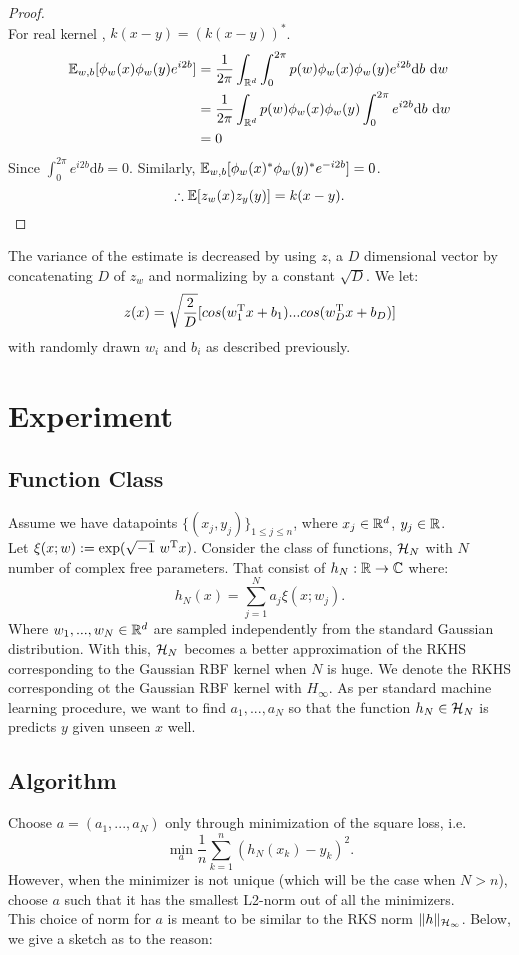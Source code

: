 \documentclass[twoside]{memoir}
\begin{document}
\begin{proof}
\begin{equation*}
	\end{equation*}
	For real kernel , $k(x - y) = (k(x - y))^*$.
	\begin{equation*}
	\begin{split}
	\mathbb{E}_{w,b}[\phi_w(x)\phi_w(y)e^{i2b}] &= \frac{1}{2\pi}\int_{\mathbb{R}^d}\int_{0}^{2\pi} p(w)\phi_w(x)\phi_w(y)e^{i2b} \text{d}b~\text{d}w \\
	&= \frac{1}{2\pi}\int_{\mathbb{R}^d} p(w)\phi_w(x)\phi_w(y) \int_{0}^{2\pi} e^{i2b} \text{d}b~\text{d}w \\
	&= 0
	\end{split}
	\end{equation*}
	Since $\int_{0}^{2\pi} e^{i2b} \text{d}b = 0$. Similarly, $	\mathbb{E}_{w,b}[\phi_w(x)^*\phi_w(y)^*e^{-i2b}] = 0$.
	\[ \therefore \mathbb{E}[z_w(x)z_y(y)] = k(x - y). \]
	
\end{proof}
The variance of the estimate is decreased by using $z$, a $D$ dimensional vector by concatenating $D$ of $z_w$ and normalizing by a constant $\sqrt{D}$. We let:
\[z(x) = \sqrt{\frac{2}{D}} [cos(w_1^{\text{T}}x + b_1) ... cos(w_D^{\text{T}}x + b_D)] \]
with randomly drawn $w_i$ and $b_i$ as described previously.

\section{Experiment} \label{sec:RFF_Exp}
\subsection{Function Class}
Assume we have datapoints $\{(x_j, y_j)\}_{1 \leq j \leq n}$, where $x_j \in \mathbb{R}^d$, $y_j \in \mathbb{R}$.\\
Let $\xi(x;w) := \exp(\sqrt{-1} ~ w^{\text{T}} x)$.
Consider the class of functions, $\mathcal{H}_N$ with $N$ number of complex free parameters. That consist of $h_N: \mathbb{R} \rightarrow \mathbb{C}$ where:
\[ h_N(x) = \sum_{j=1}^{N} a_j \xi(x;w_j). \]
Where $w_1,..., w_N \in \mathbb{R}^d$ are sampled independently from the standard Gaussian distribution. With this, $\mathcal{H}_N$ becomes a better approximation of the RKHS corresponding to the Gaussian RBF kernel when $N$ is huge. We denote the RKHS corresponding ot the Gaussian RBF kernel with $H_\infty$. As per standard machine learning procedure, we want to find $a_1, ..., a_N$ so that the function $h_N \in \mathcal{H}_N$ is predicts $y$ given unseen $x$ well.
\subsection{Algorithm}
Choose $a = (a_1,..., a_N)$ only through minimization of the square loss, i.e.
\[ \min_{a} \frac{1}{n} \sum_{k=1}^{n}(h_N(x_k) - y_k)^2. \]
However, when the minimizer is not unique (which will be the case when $N > n$), choose $a$ such that it has the smallest L2-norm out of all the minimizers. \\
This choice of norm for $a$ is meant to be similar to the RKS norm $\lVert h\rVert_{\mathcal{H}_\infty}$. Below, we give a sketch as to the reason:
\end{document}
